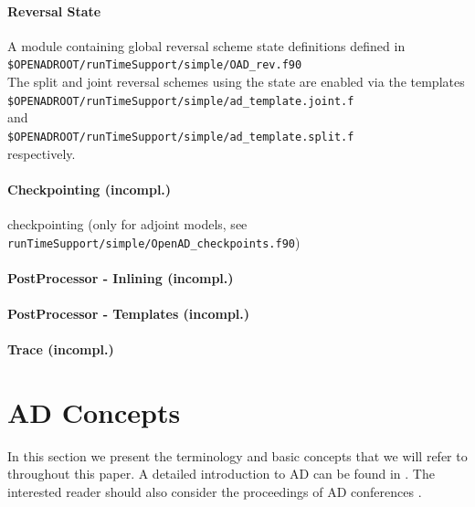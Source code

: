\documentclass{book}
\begin{document}
\subsubsection{Reversal State}
A module containing global reversal scheme state definitions defined in  \\[1ex]
\hspace*{.3cm}\lstinline{$OPENADROOT/runTimeSupport/simple/OAD_rev.f90}\\[1ex] %
The split and joint reversal schemes using the state are enabled via the templates \\[1ex]
\hspace*{.3cm}\lstinline{$OPENADROOT/runTimeSupport/simple/ad_template.joint.f}\\[1ex] %
and\\[1ex]
\hspace*{.3cm}\lstinline{$OPENADROOT/runTimeSupport/simple/ad_template.split.f}\\[1ex] %
respectively.

\subsubsection{Checkpointing (incompl.)}

checkpointing (only  for adjoint models, see \lstinline{runTimeSupport/simple/OpenAD_checkpoints.f90})

\subsubsection{PostProcessor - Inlining (incompl.)}

\subsubsection{PostProcessor - Templates (incompl.)}

\subsubsection{Trace (incompl.)}

\chapter{AD Concepts}\label{sec:ADIntro}

In this section we present the terminology and basic concepts that 
we will refer to throughout this paper. 
A detailed introduction to AD can be found in \cite{Griewank2008EDP}.
The interested reader should also consider the proceedings of AD 
conferences \cite{Griewank1991ADo,Berz1996CDT,Corliss2002ADo,Bucker2005ADA,Bischof2008AiA}.
\end{document}
